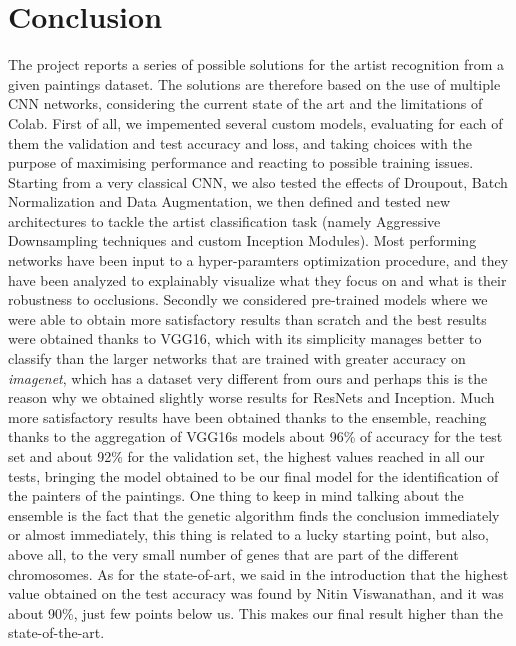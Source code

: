 \section{Conclusion}
The project reports a series of possible solutions for the artist recognition from a given paintings dataset. The solutions are therefore based on the use of multiple CNN networks, considering the current state of the art and the limitations of Colab.
First of all, we impemented several custom models, evaluating for each of them the validation and test accuracy and loss, and taking choices with the purpose of maximising performance and reacting to possible training issues. Starting from a very classical CNN, we also tested the effects of Droupout, Batch Normalization and Data Augmentation, we then defined and tested new architectures to tackle the artist classification task (namely Aggressive Downsampling techniques and custom Inception Modules). Most performing networks have been input to a hyper-paramters optimization procedure, and they have been analyzed to explainably visualize what they focus on and what is their robustness to occlusions.
Secondly we considered pre-trained models where we were able to obtain more satisfactory results than scratch and the best results were obtained thanks to VGG16, which with its simplicity manages better to classify than the larger networks that are trained with greater accuracy on \textit{imagenet}, which has a dataset very different from ours and perhaps this is the reason why we obtained slightly worse results for ResNets and Inception. 
Much more satisfactory results have been obtained thanks to the ensemble, reaching thanks to the aggregation of VGG16s models about 96\% of accuracy for the test set and about 92\% for the validation set, the highest values reached in all our tests, bringing the model obtained to be our final model for the identification of the painters of the paintings. One thing to keep in mind talking about the ensemble is the fact that the genetic algorithm finds the conclusion immediately or almost immediately, this thing is related to a lucky starting point, but also, above all, to the very small number of genes that are part of the different chromosomes.
As for the state-of-art, we said in the introduction that the highest value obtained on the test accuracy was found by Nitin Viswanathan, and it was about 90\%, just few points below us. This makes our final result higher than the state-of-the-art.
